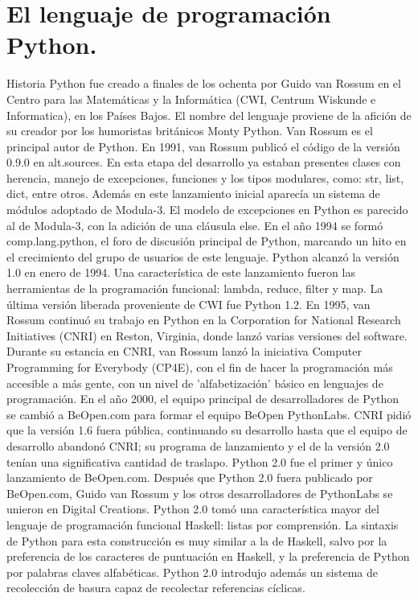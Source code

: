 \section{El lenguaje de programación Python.}

Historia
Python fue creado a finales de los ochenta por Guido van Rossum en el Centro para las Matemáticas y la Informática (CWI, Centrum Wiskunde e Informatica), en los Países Bajos.
El nombre del lenguaje proviene de la afición de su creador por los humoristas británicos Monty Python.
Van Rossum es el principal autor de Python.
En 1991, van Rossum publicó el código de la versión 0.9.0 en alt.sources. En esta etapa del desarrollo ya estaban presentes clases con herencia, manejo de excepciones, funciones y los tipos modulares, como: str, list, dict, entre otros. Además en este lanzamiento inicial aparecía un sistema de módulos adoptado de Modula-3. El modelo de excepciones en Python es parecido al de Modula-3, con la adición de una cláusula else. En el año 1994 se formó comp.lang.python, el foro de discusión principal de Python, marcando un hito en el crecimiento del grupo de usuarios de este lenguaje.
Python alcanzó la versión 1.0 en enero de 1994. Una característica de este lanzamiento fueron las herramientas de la programación funcional: lambda, reduce, filter y map.
La última versión liberada proveniente de CWI fue Python 1.2. En 1995, van Rossum continuó su trabajo en Python en la Corporation for National Research Initiatives (CNRI) en Reston, Virginia, donde lanzó varias versiones del software.
Durante su estancia en CNRI, van Rossum lanzó la iniciativa Computer Programming for Everybody (CP4E), con el fin de hacer la programación más accesible a más gente, con un nivel de 'alfabetización' básico en lenguajes de programación.
En el año 2000, el equipo principal de desarrolladores de Python se cambió a BeOpen.com para formar el equipo BeOpen PythonLabs. CNRI pidió que la versión 1.6 fuera pública, continuando su desarrollo hasta que el equipo de desarrollo abandonó CNRI; su programa de lanzamiento y el de la versión 2.0 tenían una significativa cantidad de traslapo.​ Python 2.0 fue el primer y único lanzamiento de BeOpen.com. Después que Python 2.0 fuera publicado por BeOpen.com, Guido van Rossum y los otros desarrolladores de PythonLabs se unieron en Digital Creations.
Python 2.0 tomó una característica mayor del lenguaje de programación funcional Haskell: listas por comprensión. La sintaxis de Python para esta construcción es muy similar a la de Haskell, salvo por la preferencia de los caracteres de puntuación en Haskell, y la preferencia de Python por palabras claves alfabéticas. Python 2.0 introdujo además un sistema de recolección de basura capaz de recolectar referencias cíclicas.
